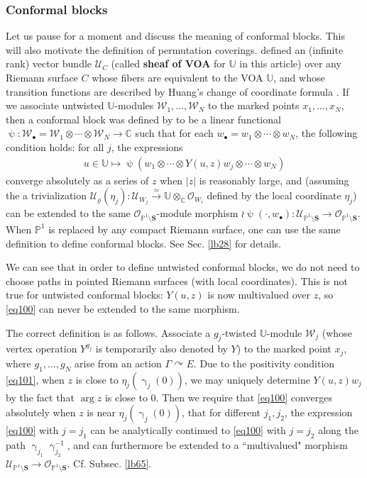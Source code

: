 \documentclass[11pt,b5paper,notitlepage]{article}
\theoremstyle{definition}
\theoremstyle{plain}
\newcommand{\mc}{\mathcal}
\newcommand{\scr}{\mathscr}
\newcommand{\blt}{\bullet}
\newcommand{\Ubb}{\mathbb U}
\newcommand{\Cbb}{\mathbb C}
\newcommand{\Pbb}{\mathbb P}
\newcommand{\Sbf}{\mathbf{S}}
\numberwithin{equation}{subsection}
\begin{document}
\subsubsection*{Conformal blocks}\label{lb67}

Let us pause for a moment and discuss the meaning of conformal blocks. This will also motivate the definition of permutation coverings. \cite{FB04} defined an (infinite rank) vector bundle $\scr U_C$ (called \textbf{sheaf of VOA} for $\Ubb$ in this article) over any Riemann surface $C$ whose fibers are equivalent to the VOA $\Ubb$, and whose transition functions are described by Huang's change of coordinate formula \cite{Hua97}. If we associate untwisted $\Ubb$-modules $\mc W_1,\dots,\mc W_N$ to the marked points $x_1,\dots,x_N$, then a conformal block was defined by \cite{FB04} to be a linear functional $\uppsi:\mc W_\blt=\mc W_1\otimes\cdots\otimes\mc W_N\rightarrow\Cbb$ such that for each $w_\blt=w_1\otimes\cdots\otimes w_N$, the following condition holds: for all $j$, the expressions 
\begin{align}
u\in\Ubb\mapsto\uppsi(w_1\otimes\cdots\otimes Y(u,z)w_j\otimes\cdots\otimes w_N)	\label{eq100}
\end{align}
converge absolutely as a series of $z$ when $|z|$ is reasonably large, and (assuming the a trivialization $\mc U_\varrho(\eta_j):\scr U_{W_j}\xrightarrow{\simeq}\Ubb\otimes_\Cbb\scr O_{W_i}$ defined by the local coordinate $\eta_j$) can be extended to the same $\scr O_{\Pbb^1\setminus\Sbf}$-module morphism $\wr\uppsi(\cdot,w_\blt):\scr U_{\Pbb^1\setminus\Sbf}\rightarrow\scr O_{\Pbb^1\setminus\Sbf}$. When $\Pbb^1$ is replaced by any compact Riemann surface, one can use the same definition to define conformal blocks. See Sec. \ref{lb28} for details.


We can see that in order  to define untwisted conformal blocks, we do not need to choose paths in pointed Riemann surfaces (with local coordinates). This is not true for untwisted conformal blocks: $Y(u,z)$ is now multivalued over $z$, so \eqref{eq100} can never be extended to the same morphism. 

The correct definition is as follows. Associate a $g_j$-twisted $\Ubb$-module $\mc W_j$ (whose vertex operation $Y^{g_j}$ is temporarily also denoted by $Y$) to the marked point $x_j$, where $g_1,\dots,g_N$ arise from an action $\Gamma\curvearrowright E$. Due to the positivity condition \eqref{eq101}, when $z$ is close to $\eta_j(\upgamma_j(0))$, we may uniquely determine $Y(u,z)w_j$ by the fact that $\arg z$ is close to $0$. Then we require that \eqref{eq100} converges absolutely when $z$ is near $\eta_j(\upgamma_j(0))$, that for different $j_1,j_2$, the expression \eqref{eq100} with $j=j_1$ can be analytically continued to \eqref{eq100} with $j=j_2$ along the path $\upgamma_{j_1}\upgamma_{j_2}^{-1}$, and  can furthermore be extended to a ``multivalued" morphism $\scr U_{\Pbb^1\setminus\Sbf}\rightarrow\scr O_{\Pbb^1\setminus\Sbf}$. Cf. Subsec. \ref{lb65}.
\end{document}
